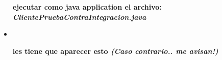 \documentclass[12pt]{article}
\begin{document}
\begin{itemize}
\begin{minipage}[t]{\linewidth}
          \medskip
          \textbf{ejecutar como java application el archivo: \emph{ClientePruebaContraIntegracion.java}} 
    \end{minipage}
    \item \ \newline
    \begin{minipage}[t]{\linewidth}
          \raggedright

          \medskip
          \textbf{les tiene que aparecer esto \emph{(Caso contrario.. me avisan!)}} 
    \end{minipage}
\end{itemize}

\clearpage
\end{document}
